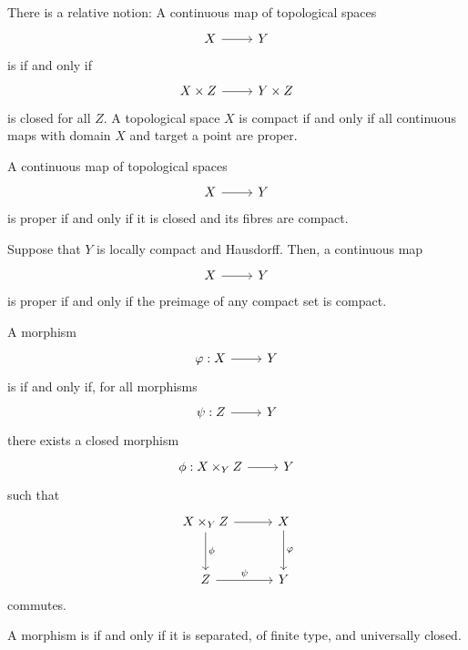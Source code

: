 \documentclass [11 pt, oneside] {article}
\begin{document}
There is a relative notion: A continuous map of topological spaces 
\[
\begin{tikzcd}
X\ar[r]&Y
\end{tikzcd}
\] 
is  if and only if
\[
\begin{tikzcd}
X\times Z\ar[r]&Y\times Z
\end{tikzcd}
\] 
is closed for all $Z$. A topological space $X$ is compact if and only if all continuous maps with domain $X$ and target a point are proper.

\begin{remark}[ ]\label{}\text{}
A continuous map of topological spaces 
\[
\begin{tikzcd}
X\ar[r]&Y
\end{tikzcd}
\] 
is proper if and only if it is closed and its fibres are compact.
\end{remark}

\begin{remark}
	Suppose that $Y$ is locally compact and Hausdorff. Then, a continuous map 
	\[
\begin{tikzcd}
X\ar[r]&Y
\end{tikzcd}
\] 
is proper if and only if the preimage of any compact set is compact. 
\end{remark}

\begin{definition}[ ]\label{}\text{}
A morphism 
\[
\begin{tikzcd}
\varphi:X\ar[r]&Y
\end{tikzcd}
\] 
is  if and only if, for all morphisms 
\[
\begin{tikzcd}
\psi:Z\ar[r]&Y
\end{tikzcd}
\]  
there exists a closed morphism 
\[
\begin{tikzcd}
\phi:X\times_Y Z\ar[r]&Y
\end{tikzcd}
\] 
such that
\[
	\begin{tikzcd}[row sep = 3 em, column sep = 3 em]
		X \times_Y Z \ar[d, "\phi"] \ar[r] & X\ar[d, "\varphi"]\\Z\ar[r,"\psi"] & Y
	\end{tikzcd}	
\]
commutes.
\end{definition}

\begin{definition}[ ]\label{}\text{}
A morphism is  if and only if it is separated, of finite type, and universally closed.
\end{definition}
\end{document}
